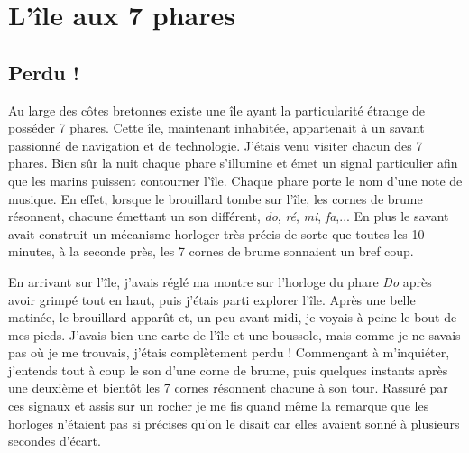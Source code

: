 \documentclass[class=report,crop=false]{standalone}
\begin{document}
\newcommand{\vect}{\overrightarrow}






\section{L'île aux 7 phares}



\subsection{Perdu !}

Au large des côtes bretonnes existe une île ayant la particularité étrange 
de posséder 7 phares. Cette île, maintenant inhabitée, appartenait à un 
savant passionné de navigation et de technologie. J'étais venu visiter 
chacun des 7 phares. Bien sûr la nuit chaque phare s'illumine et émet un signal
particulier afin que les marins puissent contourner l'île. Chaque phare porte 
le nom d'une note de musique. En effet, lorsque
le brouillard tombe sur l'île, les cornes de brume résonnent, chacune émettant 
un son différent, \emph{do}, \emph{ré}, \emph{mi}, \emph{fa},...
En plus le savant avait construit un mécanisme horloger très précis de sorte que toutes les 
10 minutes, à la seconde près, les 7 cornes de brume sonnaient un bref coup.



En arrivant sur l'île, j'avais réglé ma montre sur l'horloge du phare \emph{Do} après avoir grimpé tout en haut,
puis j'étais parti explorer l'île. Après une belle matinée, le brouillard apparût et, 
un peu avant midi, je voyais à peine le bout de mes pieds. J'avais bien une carte de l'île
et une boussole, mais comme je ne savais pas où je me trouvais, j'étais complètement perdu !
Commençant à m’inquiéter, j'entends tout à coup le son d'une corne de brume, puis quelques instants
après une deuxième et bientôt les 7 cornes résonnent chacune à son tour. Rassuré par ces signaux et 
assis sur un rocher je me fis quand même la remarque que les horloges n'étaient 
pas si précises qu'on le disait car elles avaient sonné à plusieurs secondes d'écart.
\end{document}

